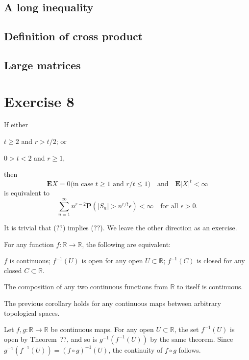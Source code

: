 \documentclass[11pt]{amsart}
\begin{document}
\subsection{A long inequality}


\subsection{Definition of cross product}


\subsection{Large matrices}



\section{Exercise 8}

If either

$t\ge2$ and $r>t/2$; or

$0>t<2$ and $r\ge1$,

then
\[
\mathbf{E} X = 0 \text{(in case $t\ge1$ and $r/t\le1$)} \quad\text{and}\quad \mathbf{E}|X|^t < \infty
\]
is equivalent to
\[
\sum_{n=1}^\infty n^{r-2}\mathbf{P}(|S_n|>n^{r/t}\epsilon) < \infty
\quad \text{for all $\epsilon>0$.}
\]

It is trivial that (??) implies (??).
We leave the other direction as an exercise.

For any function $f\colon\mathbb{R} \to \mathbb{R}$, the following are equivalent:

$f$ is continuous;
$f^{-1}(U)$ is open for any open $U\subset\mathbb{R}$;
$f^{-1}(C)$ is closed for any closed $C\subset\mathbb{R}$.

The composition of any two continuous functions from $\mathbb{R}$ to itself is continuous.

The previous corollary holds for any continuous maps between arbitrary topological spaces.

Let $f,g\colon\mathbb{R}\to\mathbb{R}$ be continuous maps.
For any open $U\subset\mathbb{R}$, the set $f^{-1}(U)$ is open by Theorem~??, and so is $g^{-1}(f^{-1}(U))$ by the same theorem.
Since $g^{-1}(f^{-1}(U)) = (f\circ g)^{-1}(U)$, the continuity of $f\circ g$ follows.
\end{document}
